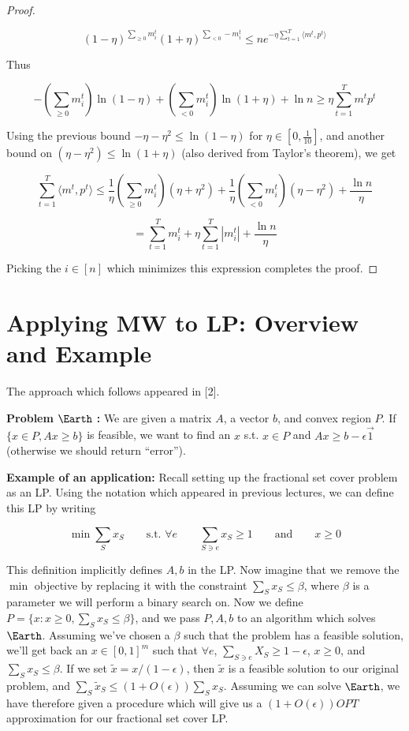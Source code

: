 \documentclass[11pt]{article}
\begin{document}
\begin{proof}
\

$$(1-\eta)^{\sum_{\geq 0} m_i^t}(1+\eta)^{\sum_{<0} -m_i^t} \leq ne^{-\eta \sum_{t=1}^T \langle m^t,p^t\rangle}$$

Thus

$$-\left (\sum_{\geq 0} m_i^t \right) \ln(1-\eta) +\left (\sum_{<0} m_i^t \right)\ln(1+\eta)+\ln n \geq \eta \sum_{t=1}^T m^t p^t$$

Using the previous bound $-\eta-\eta^2 \leq \ln(1-\eta)$ for $\eta \in [0,\frac{1}{10}]$, and another bound on $(\eta-\eta^2)\leq \ln(1+\eta)$ (also derived from Taylor's theorem), we get

$$\sum_{t=1}^T \langle m^t,p^t \rangle \leq \frac{1}{\eta} \left ( \sum_{\geq 0} m_i^t \right )(\eta+\eta^2)+\frac{1}{\eta} \left (\sum_{<0} m_i^t \right)(\eta-\eta^2)+\frac{\ln n}{\eta}$$

$$=\sum_{t=1}^T m_i^t+\eta \sum_{t=1}^T |m_i^t|+\frac{\ln n}{\eta}$$



Picking the $i \in [n]$ which minimizes this expression completes the proof. 

\end{proof} 


\section{Applying MW to LP: Overview and Example}

The approach which follows appeared in [2].  

\textbf{Problem} $\Earth$  \textbf{:} We are given a matrix $A$, a vector $b$, and convex region $P$. If $\{ x \in P, Ax \geq b\}$ is feasible, we want to find an $x$ s.t. $x \in P$ and $Ax \geq b-\epsilon \vec{1}$ (otherwise we should return ``error''). 

\textbf{Example of an application:} Recall setting up the fractional set cover problem as an LP. Using the notation which appeared in previous lectures, we can define this LP by writing 

\[
  \min \sum_{S} x_{S} \qquad\text{s.t. } \forall e \qquad \sum_{S \ni e} x_{S} \geq 1 \qquad \text{and} \qquad x \geq 0
\]

This definition implicitly defines $A,b$ in the LP. Now imagine that we remove the $\min$ objective by replacing it with the constraint $\sum_{S} x_{S} \leq \beta$, where $\beta$ is a parameter we will perform a binary search on. Now we define $P=\{x: x \geq 0, \sum_{S} x_{S} \leq \beta\}$, and we pass $P,A,b$ to an algorithm which solves $\Earth$. Assuming we've chosen a $\beta$ such that the problem has a feasible solution, we'll get back an $x \in [0,1]^m$ such that $\forall e$, $\sum_{S \ni e} X_{S} \geq 1-\epsilon$, $x \geq 0$, and $\sum_{S} x_{S} \leq \beta$. If we set $\tilde{x}=x/(1-\epsilon)$, then $\tilde{x}$ is a feasible solution to our original problem, and $\sum_{S} \tilde{x}_{S} \leq (1+O(\epsilon)) \sum_{S} x_{S}$. Assuming we can solve $\Earth$, we have therefore given a procedure which will give us a $(1+O(\epsilon))OPT$ approximation for our fractional set cover LP. 
\end{document}
